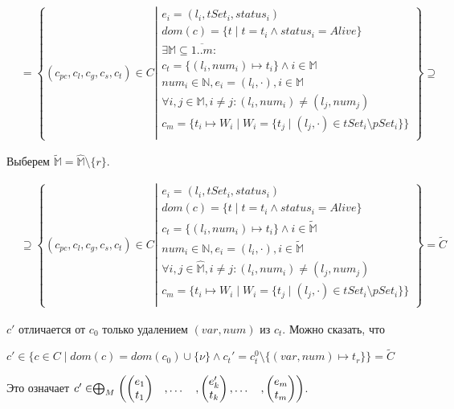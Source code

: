 \begin{align}
& = \left\lbrace (c_{pc},c_l,c_g,c_s, c_t) \in C 
\left| 
\begin{array}{c}
e_i = (l_i, tSet_i, status_i) \\
dom(c) = \{t \mid t = t_i \land status_i = Alive\}\\
\exists \mathbb{M} \subseteq \overline{1..m}: \\
c_t = \{(l_i, num_i) \mapsto t_i\} \land i \in \mathbb{M} \\
num_i \in \mathbb{N}, e_i = (l_i, \cdot), i \in \mathbb{M} \\
\forall i, j \in \mathbb{M}, i \neq j: (l_i, num_i) \neq (l_j, num_j)\\
c_m = \{t_i \mapsto W_i \mid W_i = \{t_j \mid (l_j, \cdot) \in tSet_i \setminus pSet_i \}\} \\
\end{array}
\right.
\right\rbrace \supseteq \nonumber
\end{align}

Выберем $\tilde{\mathbb{M}} = \widehat{\mathbb{M}} \setminus \{r\}$.

\begin{align}
& \supseteq \left\lbrace (c_{pc},c_l,c_g,c_s, c_t) \in C 
\left| 
\begin{array}{c}
e_i = (l_i, tSet_i, status_i) \\
dom(c) = \{t \mid t = t_i \land status_i = Alive\}\\
c_t = \{(l_i, num_i) \mapsto t_i\} \land i \in \tilde{\mathbb{M}} \\
num_i \in \mathbb{N}, e_i = (l_i, \cdot), i \in \tilde{\mathbb{M}} \\
\forall i, j \in \widehat{\mathbb{M}}, i \neq j: (l_i, num_i) \neq (l_j, num_j)\\
c_m = \{t_i \mapsto W_i \mid W_i = \{t_j \mid (l_j, \cdot) \in tSet_i \setminus pSet_i \}\} \\
\end{array}
\right.
\right\rbrace = \tilde{C} \nonumber
\end{align}

$c'$ отличается от $c_0$ только удалением $(var, num)$ из $c_t$. 
Можно сказать, что

$c' \in \{c \in C \mid dom(c) = dom(c_0)  \cup \{\nu\} \land c_t' = c^0_t \setminus \{(var, num) \mapsto t_r\} \} = \tilde{C}$

Это означает $c' \in \mathrel{\bigoplus}_M
\begin{pmatrix}
\begin{pmatrix}
e_1 \\
t_1 
\end{pmatrix}& ,
\dots& ,
\begin{pmatrix}
e_k' \\
t_k 
\end{pmatrix},
\dots& ,
\begin{pmatrix}
e_m \\
t_m 
\end{pmatrix}
\end{pmatrix}$.

